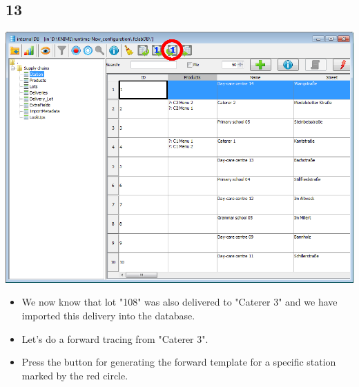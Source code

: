 \documentclass{beamer}
\begin{document}
\subsection{13}
\begin{frame}
	\begin{center}
  		\includegraphics[height=0.6\textheight]{13.png}
	\end{center}
	\begin{itemize}
		\item We now know that lot "108" was also delivered to "Caterer 3" and we have imported this delivery into the database.
		\item Let's do a forward tracing from "Caterer 3".
		\item Press the button for generating the forward template for a specific station marked by the red circle.
	\end{itemize}
\end{frame}
\end{document}
